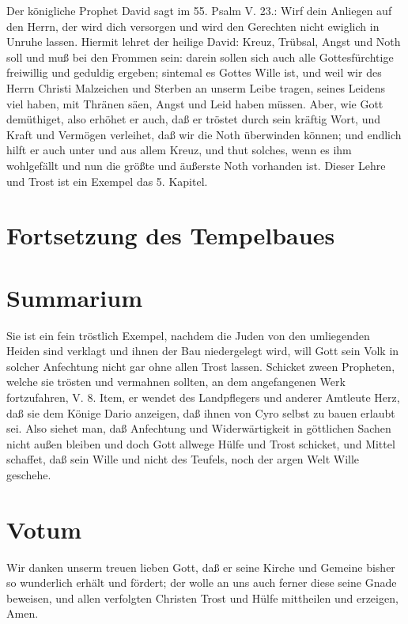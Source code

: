 Der königliche Prophet David sagt im 55. Psalm V. 23.: Wirf dein Anliegen auf den Herrn, der wird dich versorgen und wird den Gerechten nicht ewiglich in Unruhe lassen. Hiermit lehret der heilige David: Kreuz, Trübsal, Angst und Noth soll und muß bei den Frommen sein: darein sollen sich auch alle Gottesfürchtige freiwillig und geduldig ergeben; sintemal es Gottes Wille ist, und weil wir des Herrn Christi Malzeichen und Sterben an unserm Leibe tragen, seines Leidens viel haben, mit Thränen säen, Angst und Leid haben müssen. Aber, wie Gott demüthiget, also erhöhet er auch, daß er tröstet durch sein kräftig Wort, und Kraft und Vermögen verleihet, daß wir die Noth überwinden können; und endlich hilft er auch unter und aus allem Kreuz, und thut solches, wenn es ihm wohlgefällt und nun die größte und äußerste Noth vorhanden ist. Dieser Lehre und Trost ist ein Exempel das 5. Kapitel.

\section{Fortsetzung des Tempelbaues}


\section{Summarium}

Sie ist ein fein tröstlich Exempel, nachdem die Juden von den umliegenden Heiden sind verklagt und ihnen der Bau niedergelegt wird, will Gott sein Volk in solcher Anfechtung nicht gar ohne allen Trost lassen. Schicket zween Propheten, welche sie trösten und vermahnen sollten, an dem angefangenen Werk fortzufahren, V. 8. Item, er wendet des Landpflegers und anderer Amtleute Herz, daß sie dem Könige Dario anzeigen, daß ihnen von Cyro selbst zu bauen erlaubt sei. Also siehet man, daß Anfechtung und Widerwärtigkeit in göttlichen Sachen nicht außen bleiben und doch Gott allwege Hülfe und Trost schicket, und Mittel schaffet, daß sein Wille und nicht des Teufels, noch der argen Welt Wille geschehe.

\section{Votum}

Wir danken unserm treuen lieben Gott, daß er seine Kirche und Gemeine bisher so wunderlich erhält und fördert; der wolle an uns auch ferner diese seine Gnade beweisen, und allen verfolgten Christen Trost und Hülfe mittheilen und erzeigen, Amen.

